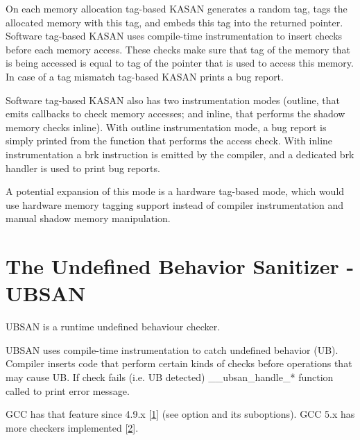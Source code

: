 \documentclass[a4paper,8pt,english]{sphinxmanual}
\begin{document}
On each memory allocation tag-based KASAN generates a random tag, tags the
allocated memory with this tag, and embeds this tag into the returned pointer.
Software tag-based KASAN uses compile-time instrumentation to insert checks
before each memory access. These checks make sure that tag of the memory that
is being accessed is equal to tag of the pointer that is used to access this
memory. In case of a tag mismatch tag-based KASAN prints a bug report.

Software tag-based KASAN also has two instrumentation modes (outline, that
emits callbacks to check memory accesses; and inline, that performs the shadow
memory checks inline). With outline instrumentation mode, a bug report is
simply printed from the function that performs the access check. With inline
instrumentation a brk instruction is emitted by the compiler, and a dedicated
brk handler is used to print bug reports.

A potential expansion of this mode is a hardware tag-based mode, which would
use hardware memory tagging support instead of compiler instrumentation and
manual shadow memory manipulation.


\chapter{The Undefined Behavior Sanitizer - UBSAN}
\label{dev-tools/ubsan:the-undefined-behavior-sanitizer-ubsan}\label{dev-tools/ubsan::doc}
UBSAN is a runtime undefined behaviour checker.

UBSAN uses compile-time instrumentation to catch undefined behavior (UB).
Compiler inserts code that perform certain kinds of checks before operations
that may cause UB. If check fails (i.e. UB detected) \_\_ubsan\_handle\_*
function called to print error message.

GCC has that feature since 4.9.x {[}\href{https://gcc.gnu.org/onlinedocs/gcc-4.9.0/gcc/Debugging-Options.html}{1}{]} (see  option and
its suboptions). GCC 5.x has more checkers implemented {[}\href{https://gcc.gnu.org/onlinedocs/gcc/Debugging-Options.html}{2}{]}.
\end{document}
